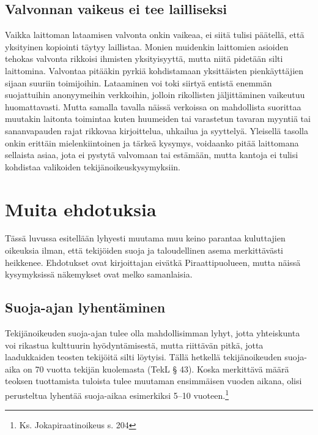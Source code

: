 \documentclass[titlepage,12pt]{article}
\begin{document}


\subsection{Valvonnan vaikeus ei tee lailliseksi}

Vaikka laittoman lataamisen valvonta onkin vaikeaa, ei siitä tulisi
päätellä, että yksityinen kopiointi täytyy laillistaa.  Monien
muidenkin laittomien asioiden tehokas valvonta rikkoisi ihmisten
yksityisyyttä, mutta niitä pidetään silti laittomina.  Valvontaa
pitääkin pyrkiä kohdistamaan yksittäisten pienkäyttäjien sijaan
suuriin toimijoihin.  Lataaminen voi toki siirtyä entistä enemmän
suojattuihin anonyymeihin verkkoihin, jolloin rikollisten
jäljittäminen vaikeutuu huomattavasti.  Mutta samalla tavalla näissä
verkoissa on mahdollista suorittaa muutakin laitonta toimintaa kuten
huumeiden tai varastetun tavaran myyntiä tai sananvapauden rajat
rikkovaa kirjoittelua, uhkailua ja syyttelyä.  Yleisellä tasolla onkin
erittäin mielenkiintoinen ja tärkeä kysymys, voidaanko pitää
laittomana sellaista asiaa, jota ei pystytä valvomaan tai estämään,
mutta kantoja ei tulisi kohdistaa valikoiden tekijänoikeuskysymyksiin.


\section{Muita ehdotuksia}

Tässä luvussa esitellään lyhyesti muutama muu keino parantaa
kuluttajien oikeuksia ilman, että tekijöiden suoja ja taloudellinen
asema merkittävästi heikkenee.  Ehdotukset ovat kirjoittajan eivätkä
Piraattipuolueen, mutta näissä kysymyksissä näkemykset ovat melko
samanlaisia.

\subsection{Suoja-ajan lyhentäminen}

Tekijänoikeuden suoja-ajan tulee olla mahdollisimman lyhyt, jotta
yhteiskunta voi rikastua kulttuurin hyödyntämisestä, mutta riittävän
pitkä, jotta laadukkaiden teosten tekijöitä silti löytyisi.  Tällä
hetkellä tekijänoikeuden suoja-aika on 70 vuotta tekijän kuolemasta
(TekL § 43).  Koska merkittävä määrä teoksen tuottamista tuloista
tulee muutaman ensimmäisen vuoden aikana, olisi perusteltua lyhentää
suoja-aikaa esimerkiksi 5--10 vuoteen.\footnote{Ks. Jokapiraatinoikeus
  s. 204}
\end{document}
